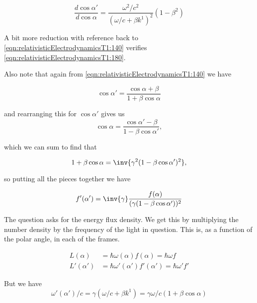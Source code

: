 \begin{equation}\label{eqn:relativisticElectrodynamicsT1:171}
\frac{d\cos\alpha'}{d\cos\alpha} = \frac{\omega^2/c^2}{(\omega/c + \beta k^1)^2} (1 - \beta^2)
\end{equation}

A bit more reduction with reference back to \ref{eqn:relativisticElectrodynamicsT1:140} verifies \ref{eqn:relativisticElectrodynamicsT1:180}.

Also note that again from \ref{eqn:relativisticElectrodynamicsT1:140} we have

\begin{equation}\label{eqn:relativisticElectrodynamicsT1:190a}
\cos\alpha' = \frac{\cos\alpha + \beta}{1 + \beta \cos\alpha}
\end{equation}

and rearranging this for $\cos\alpha'$ gives us
\begin{equation}\label{eqn:relativisticElectrodynamicsT1:190}
\cos\alpha = \frac{\cos\alpha' - \beta}{1 - \beta \cos\alpha'},
\end{equation}

which we can sum to find that 

\begin{equation}\label{eqn:relativisticElectrodynamicsT1:190b}
1 + \beta \cos\alpha = \inv{\gamma^2 (1 - \beta \cos \alpha')^2 },
\end{equation}

so putting all the pieces together we have

\begin{equation}\label{eqn:relativisticElectrodynamicsT1:200}
f'(\alpha') = \inv{\gamma} \frac{f(\alpha)}{(\gamma (1-\beta \cos\alpha'))^2}
\end{equation}

The question asks for the energy flux density.  We get this by multiplying the number density by the frequency of the light in question.  This is, as a function of the polar angle, in each of the frames.

\begin{align}\label{eqn:relativisticElectrodynamicsT1:210}
L(\alpha) &= \hbar \omega(\alpha) f(\alpha) = \hbar \omega f \\
L'(\alpha') &= \hbar \omega'(\alpha') f'(\alpha') = \hbar \omega' f'
\end{align}

But we have
\begin{equation}\label{eqn:relativisticElectrodynamicsT1:220}
\omega'(\alpha')/c = \gamma( \omega/c + \beta k^1 ) = \gamma \omega/c ( 1 + \beta \cos\alpha )
\end{equation}


